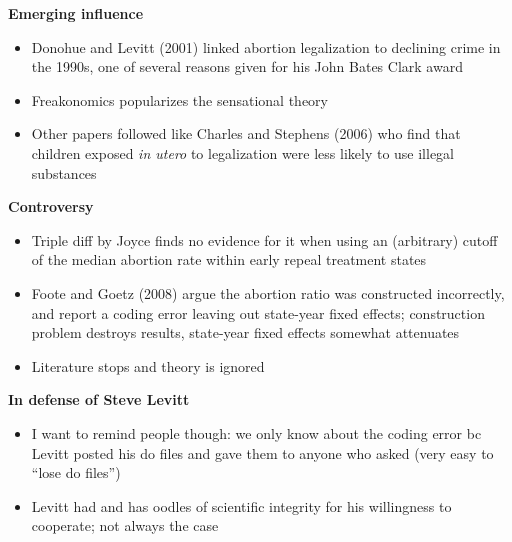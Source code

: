 \documentclass[notes=show]{beamer}
\begin{document}
\begin{frame}[plain]
\begin{center}
\textbf{Emerging influence}
\end{center}

\begin{itemize}
	\item Donohue and Levitt (2001) linked abortion legalization to declining crime in the 1990s, one of several reasons given for his John Bates Clark award
	\item Freakonomics popularizes the sensational theory
	\item Other papers followed like Charles and Stephens (2006) who find that children exposed \emph{in utero} to legalization were less likely to use illegal substances

\end{itemize}

\end{frame}

\begin{frame}[plain]
\begin{center}
\textbf{Controversy}
\end{center}

\begin{itemize}
	\item Triple diff by Joyce finds no evidence for it when using an (arbitrary) cutoff of the median abortion rate within early repeal treatment states
	\item Foote and Goetz (2008) argue the abortion ratio was constructed incorrectly, and report a coding error leaving out state-year fixed effects; construction problem destroys results, state-year fixed effects somewhat attenuates
	\item Literature stops and theory is ignored
\end{itemize}

\end{frame}

\begin{frame}[plain]
\begin{center}
\textbf{In defense of Steve Levitt}
\end{center}

		\begin{itemize}
		\item I want to remind people though: we only know about the coding error bc Levitt posted his do files and gave them to anyone who asked (very easy to ``lose do files'')
		\item Levitt had and has oodles of scientific integrity for his willingness to cooperate; not always the case
		\end{itemize}

\end{frame}
\end{document}

